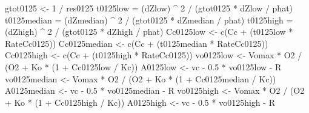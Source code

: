 \documentclass[
]{krantz}
\makeatletter
\newenvironment{Shaded}{\begin{snugshade}}{\end{snugshade}}
\newcommand{\DecValTok}[1]{\textcolor[rgb]{0.00,0.00,0.81}{#1}}
\newcommand{\FloatTok}[1]{\textcolor[rgb]{0.00,0.00,0.81}{#1}}
\newcommand{\FunctionTok}[1]{\textcolor[rgb]{0.00,0.00,0.00}{#1}}
\newcommand{\NormalTok}[1]{#1}
\newcommand{\OtherTok}[1]{\textcolor[rgb]{0.56,0.35,0.01}{#1}}
\newcommand{\SpecialCharTok}[1]{\textcolor[rgb]{0.00,0.00,0.00}{#1}}
\newenvironment{kframe}{%
\medskip{}
\setlength{\fboxsep}{.8em}
 \def\at@end@of@kframe{}%
 \ifinner\ifhmode%
  \def\at@end@of@kframe{\end{minipage}}%
  \begin{minipage}{\columnwidth}%
 \fi\fi%
 \def\FrameCommand##1{\hskip\@totalleftmargin \hskip-\fboxsep
 \colorbox{shadecolor}{##1}\hskip-\fboxsep
     \hskip-\linewidth \hskip-\@totalleftmargin \hskip\columnwidth}%
 \MakeFramed {\advance\hsize-\width
   \@totalleftmargin\z@ \linewidth\hsize
   \@setminipage}}%
 {\par\unskip\endMakeFramed%
 \at@end@of@kframe}
\renewenvironment{Shaded}{\begin{kframe}}{\end{kframe}}
\makeatother
\begin{document}
\begin{Shaded}
\begin{Highlighting}[]
\NormalTok{gtot0125 }\OtherTok{\textless{}{-}} \DecValTok{1} \SpecialCharTok{/}\NormalTok{ res0125}
\NormalTok{t0125low }\OtherTok{=}\NormalTok{ (dZlow) }\SpecialCharTok{\^{}} \DecValTok{2} \SpecialCharTok{/}\NormalTok{ (gtot0125 }\SpecialCharTok{*}\NormalTok{ dZlow }\SpecialCharTok{/}\NormalTok{ phat)}
\NormalTok{t0125median }\OtherTok{=}\NormalTok{ (dZmedian) }\SpecialCharTok{\^{}} \DecValTok{2} \SpecialCharTok{/}\NormalTok{ (gtot0125 }\SpecialCharTok{*}\NormalTok{ dZmedian }\SpecialCharTok{/}\NormalTok{ phat)}
\NormalTok{t0125high }\OtherTok{=}\NormalTok{ (dZhigh) }\SpecialCharTok{\^{}} \DecValTok{2} \SpecialCharTok{/}\NormalTok{ (gtot0125 }\SpecialCharTok{*}\NormalTok{ dZhigh }\SpecialCharTok{/}\NormalTok{ phat)}
\NormalTok{Cc0125low }\OtherTok{\textless{}{-}} \FunctionTok{c}\NormalTok{(Cc }\SpecialCharTok{+}\NormalTok{ (t0125low }\SpecialCharTok{*}\NormalTok{ RateCc0125))}
\NormalTok{Cc0125median }\OtherTok{\textless{}{-}} \FunctionTok{c}\NormalTok{(Cc }\SpecialCharTok{+}\NormalTok{ (t0125median }\SpecialCharTok{*}\NormalTok{ RateCc0125))}
\NormalTok{Cc0125high }\OtherTok{\textless{}{-}} \FunctionTok{c}\NormalTok{(Cc }\SpecialCharTok{+}\NormalTok{ (t0125high }\SpecialCharTok{*}\NormalTok{ RateCc0125))}
\NormalTok{vo0125low }\OtherTok{\textless{}{-}}\NormalTok{ Vomax }\SpecialCharTok{*}\NormalTok{ O2 }\SpecialCharTok{/}\NormalTok{ (O2 }\SpecialCharTok{+}\NormalTok{ Ko }\SpecialCharTok{*}\NormalTok{ (}\DecValTok{1} \SpecialCharTok{+}\NormalTok{ Cc0125low }\SpecialCharTok{/}\NormalTok{ Kc)) }
\NormalTok{A0125low }\OtherTok{\textless{}{-}}\NormalTok{ vc }\SpecialCharTok{{-}} \FloatTok{0.5} \SpecialCharTok{*}\NormalTok{ vo0125low }\SpecialCharTok{{-}}\NormalTok{ R }
\NormalTok{vo0125median }\OtherTok{\textless{}{-}}\NormalTok{ Vomax }\SpecialCharTok{*}\NormalTok{ O2 }\SpecialCharTok{/}\NormalTok{ (O2 }\SpecialCharTok{+}\NormalTok{ Ko }\SpecialCharTok{*}\NormalTok{ (}\DecValTok{1} \SpecialCharTok{+}\NormalTok{ Cc0125median }\SpecialCharTok{/}\NormalTok{ Kc)) }
\NormalTok{A0125median }\OtherTok{\textless{}{-}}\NormalTok{ vc }\SpecialCharTok{{-}} \FloatTok{0.5} \SpecialCharTok{*}\NormalTok{ vo0125median }\SpecialCharTok{{-}}\NormalTok{ R }
\NormalTok{vo0125high }\OtherTok{\textless{}{-}}\NormalTok{ Vomax }\SpecialCharTok{*}\NormalTok{ O2 }\SpecialCharTok{/}\NormalTok{ (O2 }\SpecialCharTok{+}\NormalTok{ Ko }\SpecialCharTok{*}\NormalTok{ (}\DecValTok{1} \SpecialCharTok{+}\NormalTok{ Cc0125high }\SpecialCharTok{/}\NormalTok{ Kc)) }
\NormalTok{A0125high }\OtherTok{\textless{}{-}}\NormalTok{ vc }\SpecialCharTok{{-}} \FloatTok{0.5} \SpecialCharTok{*}\NormalTok{ vo0125high }\SpecialCharTok{{-}}\NormalTok{ R }


\end{Highlighting}
\end{Shaded}
\end{document}
